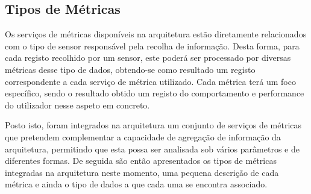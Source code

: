 \subsection{Tipos de Métricas}

Os serviços de métricas disponíveis na arquitetura estão diretamente relacionados com o tipo de sensor responsável pela recolha de informação. Desta forma, para cada registo recolhido por um sensor, este poderá ser processado por diversas métricas desse tipo de dados, obtendo-se como resultado um registo correspondente a cada serviço de métrica utilizado. Cada métrica terá um foco específico, sendo o resultado obtido um registo do comportamento e performance do utilizador nesse aspeto em concreto\cite{pimenta2014analysis}.

Posto isto, foram integrados na arquitetura um conjunto de serviços de métricas que pretendem complementar a capacidade de agregação de informação da arquitetura, permitindo que esta possa ser analisada sob vários parâmetros e de diferentes formas. De seguida são então apresentados os tipos de métricas integradas na arquitetura neste momento, uma pequena descrição de cada métrica e ainda o tipo de dados a que cada uma se encontra associado.


